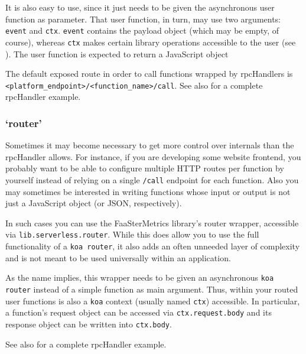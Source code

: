 \documentclass[../main.tex]{subfiles}
\begin{document}
It is also easy to use, since it just needs to be given the asynchronous user function as parameter. 
That user function, in turn, may use two arguments: \texttt{event} and \texttt{ctx}.
\texttt{event} contains the payload object (which may be empty, of course), whereas \texttt{ctx} makes certain 
library operations accessible to the user (see ).
The user function is expected to return a JavaScript object

The default exposed route in order to call functions wrapped by rpcHandlers is 
\texttt{<platform\_endpoint>/<function\_name>/call}.
See also  for a complete rpcHandler example.

\subsubsection{`router'}%
\label{ssub:functionRouter}

Sometimes it may become necessary to get more control over internals than the rpcHandler allows.
For instance, if you are developing some website frontend, you probably want to be able to configure multiple HTTP routes per function by yourself
instead of relying on a single \texttt{/call} endpoint for each function.
Also you may sometimes be interested in writing functions whose input or output is not just a JavaScript object (or JSON, respectively).

In such cases you can use the FaaSterMetrics library's router wrapper, 
accessible via \texttt{lib.serverless.router}.
While this does allow you to use the full functionality of a \texttt{koa router}\protect\footnotemark,
it also adds an often unneeded layer of complexity and is not meant to be used universally within an application.

As the name implies, this wrapper needs to be given an asynchronous \texttt{koa router}
instead of a simple function as main argument.
Thus, within your routed user functions is also a \texttt{koa} context (usually named \texttt{ctx})
accessible. 
In particular, a function's request object can be accessed via \texttt{ctx.request.body}
and its response object can be written into \texttt{ctx.body}.

See also  for a complete rpcHandler example.
\end{document}
